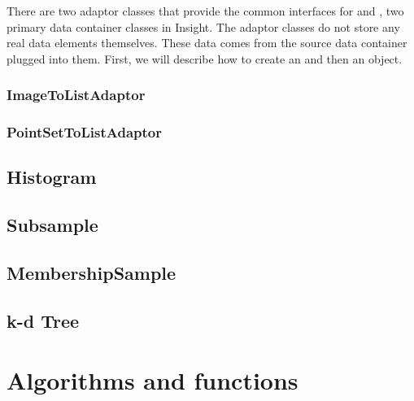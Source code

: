 There are two adaptor classes that provide the common
 interfaces for  and
, two primary data container classes in Insight. The
adaptor classes do not store any real data elements themselves. These
data comes from the source data container plugged into them. First, we
will describe how to create an
 and then an
 object.

\subsubsection{ImageToListAdaptor}
\label{sec:ImageToListAdaptor}



\subsubsection{PointSetToListAdaptor}
\label{sec:PointSetToListAdaptor}



\subsection{Histogram}
\label{sec:Histogram}



\subsection{Subsample}
\label{sec:Subsample}



\subsection{MembershipSample}
\label{sec:MembershipSample}



\subsection{k-d Tree}
\label{sec:KdTree}



\section{Algorithms and functions}
\label{sec:StatisticsAlgorithmsFunctions}

